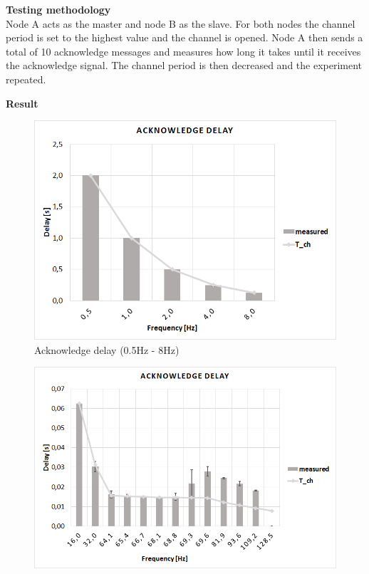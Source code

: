 \begin{description}
	\item{\textbf{Testing methodology}} \hfill \\ Node A acts as the master and node B as the slave. For both nodes the channel period is set to the highest value and the channel is opened. Node A then sends a total of 10 acknowledge messages and measures how long it takes until it receives the
	acknowledge signal. The channel period is then decreased and the experiment repeated.
	
	\newpage
	\item{\textbf{Result}} \hfill \\  
	\begin{figure}[H]
		\centering
		\includegraphics[scale=0.5]{content/images/exp4_norm.png}
		\caption{Acknowledge delay (0.5Hz - 8Hz)}\label{fig:exp3low}
	\end{figure}
	\begin{figure}[H]
		\centering
		\includegraphics[scale=0.5]{content/images/exp4_detail.png}

\end{figure}
\end{description}
